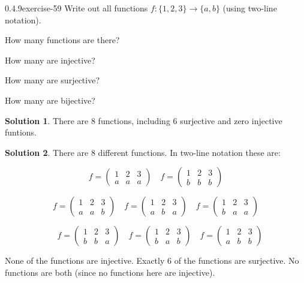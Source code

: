 \documentclass[twoside,11pt,]{book}
\numberwithin{equation}{chapter}
\newcommand{\amp}{&}
\begin{document}
\begin{divisionsolution}{0.4.9}{}{exercise-59}%
\hypertarget{p-1020}{}%
Write out all functions \(f: \{1,2,3\} \to \{a,b\}\) (using two-line notation).%
\par
\hypertarget{p-1021}{}%
How many functions are there?%
\par
\hypertarget{p-1023}{}%
How many are injective?%
\par
\hypertarget{p-1025}{}%
How many are surjective?%
\par
\hypertarget{p-1027}{}%
How many are bijective?%
\par\smallskip%
\noindent\textbf{Solution 1}.\quad%
\hypertarget{p-1029}{}%
There are 8 functions, including 6 surjective and zero injective funtions.%
\par\smallskip%
\noindent\textbf{Solution 2}.\quad%
\hypertarget{p-1030}{}%
There are 8 different functions. In two-line notation these are:%
\par
\hypertarget{p-1031}{}%
%
\begin{equation*}
f = \begin{pmatrix} 1 \amp 2 \amp 3 \\ a \amp a\amp a \end{pmatrix} \quad f = \begin{pmatrix} 1 \amp 2 \amp 3 \\ b \amp b \amp b \end{pmatrix}
\end{equation*}
%
\par
\hypertarget{p-1032}{}%
%
\begin{equation*}
f = \begin{pmatrix} 1 \amp 2 \amp 3 \\ a \amp a\amp b \end{pmatrix} \quad f = \begin{pmatrix} 1 \amp 2 \amp 3 \\ a \amp b \amp a \end{pmatrix} \quad f = \begin{pmatrix} 1 \amp 2 \amp 3 \\ b \amp a\amp a \end{pmatrix}
\end{equation*}
%
\par
\hypertarget{p-1033}{}%
%
\begin{equation*}
\quad f = \begin{pmatrix} 1 \amp 2 \amp 3 \\ b \amp b \amp a \end{pmatrix} \quad f = \begin{pmatrix} 1 \amp 2 \amp 3 \\ b \amp a\amp b \end{pmatrix} \quad f = \begin{pmatrix} 1 \amp 2 \amp 3 \\ a \amp b \amp b \end{pmatrix}
\end{equation*}
%
\par
\hypertarget{p-1034}{}%
None of the functions are injective. Exactly 6 of the functions are surjective. No functions are both (since no functions here are injective).%
\end{divisionsolution}%
\end{document}
